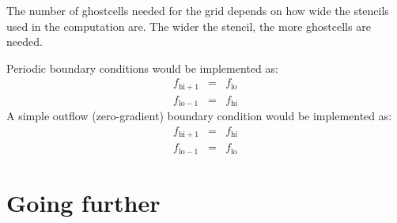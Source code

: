 The number of ghostcells needed for the grid depends on how wide the
stencils used in the computation are.  The wider the stencil, the more
ghostcells are needed.

Periodic boundary conditions would be implemented as:
\begin{eqnarray}
f_{\mathrm{hi}+1} &=& f_\mathrm{lo} \\
f_{\mathrm{lo}-1} &=& f_\mathrm{hi}
\end{eqnarray}
A simple outflow (zero-gradient) boundary condition would be implemented as:
\begin{eqnarray}
f_{\mathrm{hi}+1} &=& f_\mathrm{hi} \\
f_{\mathrm{lo}-1} &=& f_\mathrm{lo}
\end{eqnarray}



\section{Going further}

